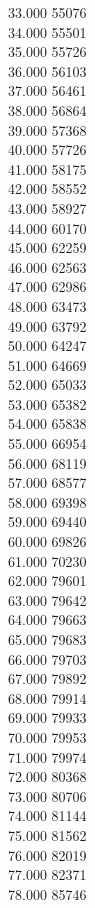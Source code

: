 { 33.000	55076 \\
 34.000	55501 \\
 35.000	55726 \\
 36.000	56103 \\
 37.000	56461 \\
 38.000	56864 \\
 39.000	57368 \\
 40.000	57726 \\
 41.000	58175 \\
 42.000	58552 \\
 43.000	58927 \\
 44.000	60170 \\
 45.000	62259 \\
 46.000	62563 \\
 47.000	62986 \\
 48.000	63473 \\
 49.000	63792 \\
 50.000	64247 \\
 51.000	64669 \\
 52.000	65033 \\
 53.000	65382 \\
 54.000	65838 \\
 55.000	66954 \\
 56.000	68119 \\
 57.000	68577 \\
 58.000	69398 \\
 59.000	69440 \\
 60.000	69826 \\
 61.000	70230 \\
 62.000	79601 \\
 63.000	79642 \\
 64.000	79663 \\
 65.000	79683 \\
 66.000	79703 \\
 67.000	79892 \\
 68.000	79914 \\
 69.000	79933 \\
 70.000	79953 \\
 71.000	79974 \\
 72.000	80368 \\
 73.000	80706 \\
 74.000	81144 \\
 75.000	81562 \\
 76.000	82019 \\
 77.000	82371 \\
 78.000	85746 \\
}
